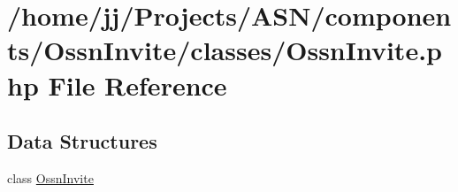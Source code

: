 \hypertarget{_ossn_invite_8php}{}\section{/home/jj/\+Projects/\+A\+S\+N/components/\+Ossn\+Invite/classes/\+Ossn\+Invite.php File Reference}
\label{_ossn_invite_8php}
\subsection*{Data Structures}
\begin{DoxyCompactItemize}
\item 
class \hyperlink{class_ossn_invite}{Ossn\+Invite}
\end{DoxyCompactItemize}
